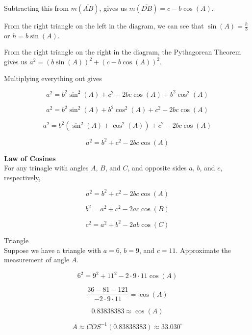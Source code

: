 \documentclass{ximera}
\begin{document}
Subtracting this from $m(\overline{AB})$, gives us $m(\overline{DB}) = c - b \cos(A)$.


From the right triangle on the left in the diagram, we can see that $\sin(A) = \frac{h}{b}$ or $h = b \sin(A)$.




From the right triangle on the right in the diagram, the Pythagorean Theorem gives us $a^2 = (b \sin(A))^2 + (c - b \cos(A))^2$.


Multiplying everything out gives


\[    a^2 = b^2 \sin^2(A) +  c^2  - 2 b c \cos(A) + b^2 \cos^2(A)  \]


\[    a^2 = b^2 \sin^2(A) + b^2 \cos^2(A) +  c^2  - 2 b c \cos(A)   \]


\[    a^2 = b^2 (\sin^2(A) + \cos^2(A)) +  c^2  - 2 b c \cos(A)   \]


\[    a^2 = b^2  +  c^2  - 2 b c \cos(A)   \]












\begin{theorem}  \textbf{\textcolor{green!50!black}{Law of Cosines}}  \\



For any trinagle with angles $A$, $B$, and $C$, and opposite sides $a$, $b$, and $c$, respectively, 


\[    a^2 = b^2  +  c^2  - 2 b c \cos(A)   \]

\[    b^2 = a^2  +  c^2  - 2 a c \cos(B)   \]

\[    c^2 = a^2  +  b^2  - 2 a b \cos(C)   \]


\end{theorem}










\begin{example} Triangle \\

Suppose we have a triangle with $a=6$, $b=9$, and $c=11$. Approximate the measurement of angle $A$.

\[    6^2 = 9^2  +  11^2  - 2 \cdot 9 \cdot 11 \cos(A)   \]


\[    \frac{36 - 81 - 121}{- 2 \cdot 9 \cdot 11} =    \cos(A)   \]

\[  0.83838383 \approx \cos(A)  \]


\[ A \approx COS^{-1}(0.83838383)  \approx 33.030^{\circ}   \]


\end{example}
\end{document}
